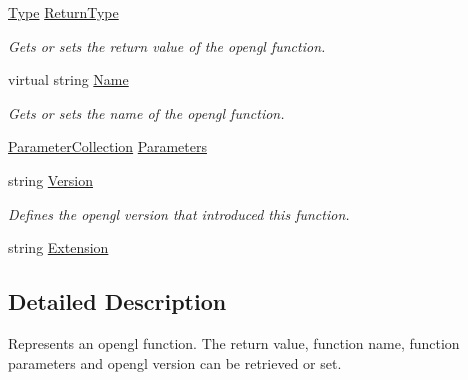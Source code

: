 \begin{DoxyCompactItemize}
\hyperlink{class_bind_1_1_structures_1_1_type}{Type} \hyperlink{class_bind_1_1_structures_1_1_delegate_ae7b3521d3169f72f96ada277263db115}{ReturnType}
\begin{DoxyCompactList}\small\item\em Gets or sets the return value of the opengl function. \item\end{DoxyCompactList}\item 
virtual string \hyperlink{class_bind_1_1_structures_1_1_delegate_a320cee119e89464c59f9ad8cec2fc4f7}{Name}
\begin{DoxyCompactList}\small\item\em Gets or sets the name of the opengl function. \item\end{DoxyCompactList}\item 
\hyperlink{class_bind_1_1_structures_1_1_parameter_collection}{ParameterCollection} \hyperlink{class_bind_1_1_structures_1_1_delegate_a53b633919f93d2785ea1e813be7a4761}{Parameters}
\item 
string \hyperlink{class_bind_1_1_structures_1_1_delegate_a25ffac475b0854ec8f8bebfac7a99875}{Version}
\begin{DoxyCompactList}\small\item\em Defines the opengl version that introduced this function. \item\end{DoxyCompactList}\item 
string \hyperlink{class_bind_1_1_structures_1_1_delegate_abc0add5a1fc2eeefc5597f8bd58fba5c}{Extension}
\end{DoxyCompactItemize}


\subsection{Detailed Description}
Represents an opengl function. The return value, function name, function parameters and opengl version can be retrieved or set. 

